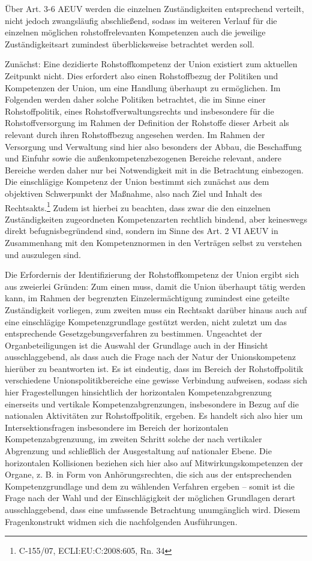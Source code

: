 \documentclass[12pt,a4paper,oneside]{book} %
\begin{document}
Über Art. 3-6 AEUV werden die einzelnen Zuständigkeiten entsprechend verteilt, nicht jedoch zwangsläufig abschließend, sodass im weiteren Verlauf für die einzelnen möglichen rohstoffrelevanten Kompetenzen auch die jeweilige Zuständigkeitsart zumindest überblicksweise betrachtet werden soll.
	
Zunächst: Eine dezidierte Rohstoffkompetenz der Union existiert zum aktuellen Zeitpunkt nicht. Dies erfordert also einen Rohstoffbezug der Politiken und Kompetenzen der Union, um eine Handlung überhaupt zu ermöglichen. Im Folgenden werden daher solche Politiken betrachtet, die im Sinne einer Rohstoffpolitik, eines Rohstoffverwaltungsrechts und insbesondere für die Rohstoffversorgung im Rahmen der Definition der Rohstoffe dieser Arbeit als relevant durch ihren Rohstoffbezug angesehen werden. Im Rahmen der Versorgung und Verwaltung sind hier also besonders der Abbau, die Beschaffung und Einfuhr sowie die außenkompetenzbezogenen Bereiche relevant, andere Bereiche werden daher nur bei Notwendigkeit mit in die Betrachtung einbezogen. Die einschlägige Kompetenz der Union bestimmt sich zunächst aus dem objektiven Schwerpunkt der Maßnahme, also nach Ziel und Inhalt des Rechtsakts.\footnote{C-155/07, ECLI:EU:C:2008:605, Rn. 34}
Zudem ist hierbei zu beachten, dass zwar die den einzelnen Zuständigkeiten zugeordneten Kompetenzarten rechtlich bindend, aber keineswegs direkt befugnisbegründend sind, sondern im Sinne des Art. 2 VI AEUV in Zusammenhang mit den Kompetenznormen in den Verträgen selbst zu verstehen und auszulegen sind.\autocite{Groeben, von der/Schwarze/Walter Obwexer, 7. Aufl. 2015, AEUV Art. 2 Rn. 9}
	
Die Erfordernis der Identifizierung der Rohstoffkompetenz der Union ergibt sich aus zweierlei Gründen: Zum einen muss, damit die Union überhaupt tätig werden kann, im Rahmen der begrenzten Einzelermächtigung zumindest eine geteilte Zuständigkeit vorliegen, zum zweiten muss ein Rechtsakt darüber hinaus auch auf eine einschlägige Kompetenzgrundlage gestützt werden, nicht zuletzt um das entsprechende Gesetzgebungsverfahren zu bestimmen. Ungeachtet der Organbeteiligungen ist die Auswahl der Grundlage auch in der Hinsicht ausschlaggebend, als dass auch die Frage nach der Natur der Unionskompetenz hierüber zu beantworten ist. Es ist eindeutig, dass im Bereich der Rohstoffpolitik verschiedene Unionspolitikbereiche eine gewisse Verbindung aufweisen, sodass sich hier Fragestellungen hinsichtlich der horizontalen Kompetenzabgrenzung einerseits und vertikale Kompetenzabgrenzungen, insbesondere in Bezug auf die nationalen Aktivitäten zur Rohstoffpolitik, ergeben. Es handelt sich also hier um Intersektionsfragen insbesondere im Bereich der horizontalen Kompetenzabgrenzuung, im zweiten Schritt solche der nach vertikaler Abgrenzung und schließlich der Ausgestaltung auf nationaler Ebene. Die horizontalen Kollisionen beziehen sich hier also auf Mitwirkungskompetenzen der Organe, z. B. in Form von Anhörungsrechten, die sich aus der entsprechenden Kompetenzgrundlage und dem zu wählenden Verfahren ergeben -- somit ist die Frage nach der Wahl und der Einschlägigkeit der möglichen Grundlagen derart ausschlaggebend, dass eine umfassende Betrachtung unumgänglich wird. Diesem Fragenkonstrukt widmen sich die nachfolgenden Ausführungen.
\end{document}
